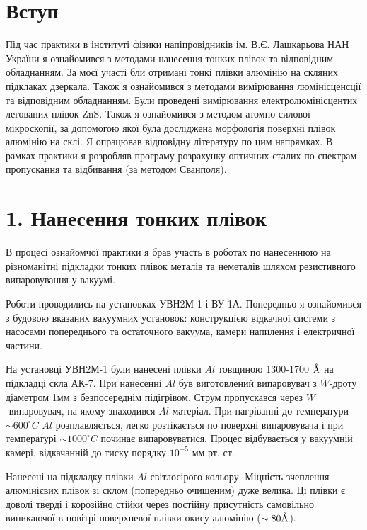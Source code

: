 \documentclass[a4paper, 14pt]{extarticle}
\begin{document}


\section{Вступ}
Під час практики в інституті фізики напіпровідників ім. В.Є. Лашкарьова НАН України я ознайомився з методами нанесення тонких плівок та відповідним обладнанням. За моєї участі бли отримані тонкі плівки алюмінію на скляних підклаках дзеркала. Також я ознайомився з методами вимірювання люмінісценсції та відповідним обладнанням. Були проведені вимірювання електролюмінісцентих легованих плівок ZnS. Також я ознайомився з методом атомно-силової мікроскопії, за допомогою якої була досліджена морфологія поверхні плівок алюмінію на склі. Я опрацював відповідну літературу по цим напрямках. В рамках практики я розробляв програму розрахунку оптичних сталих по спектрам пропускання та відбивання (за методом Сванполя).
\newpage
\section{1. Нанесення тонких плівок}

В процесі ознайомчої практики я брав участь в роботах по нанесеннюю на різноманітні підкладки тонких плівок металів та неметалів шляхом резистивного випаровування у вакуумі.

Роботи проводились на установках УВН2М-1 і ВУ-1А. Попередньо я ознайомився з будовою вказаних вакуумних установок: конструкцією відкачної системи з насосами попереднього та остаточного вакуума, камери напилення і електричної частини.

На установці УВН2М-1 були нанесені плівки $Al$ товщиною 1300-1700 $\mbox{\normalfont\AA}$ на підкладці скла АК-7. При нанесенні  $Al$ був виготовлений випаровувач з $W$-дроту діаметром 1мм з безпосереднім підігрівом. Струм пропускався через $W$-випаровувач, на якому знаходився $Al$-матеріал. При нагріванні до температури $\sim 600 ^{\circ}C$ $Al$ розплавляється, легко розтікається по поверхні випаровувача і при температурі $\sim 1000 ^{\circ}C$ починає випаровуватися. Процес відбувається у вакуумній камері, відкачанній до тиску порядку $10^{-5}$ мм рт. ст.

Нанесені на підкладку плівки $Al$ світлосірого кольору. Міцність зчеплення алюмінієвих плівок зі склом (попередньо очищеним) дуже велика. Ці плівки є доволі тверді і корозійно стійки через постійну присутність самовільно виникаючої в повітрі поверхневої плівки окису алюмінію ($\sim 80 {\mbox{\normalfont\AA}}$).
\end{document}
